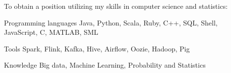

\begin{cvparagraph}

To obtain a position utilizing my skills in computer science and statistics:

\begin{cvskills}

  \cvskill
    {Programming languages} %
    {Java, Python, Scala, Ruby, C++, SQL, Shell, JavaScript, C, MATLAB, SML} %

  \cvskill
    {Tools} %
    {Spark, Flink, Kafka, Hive, Airflow, Oozie, Hadoop, Pig} %

  \cvskill
    {Knowledge} %
    {Big data, Machine Learning, Probability and Statistics} %

\end{cvskills}


\end{cvparagraph}

